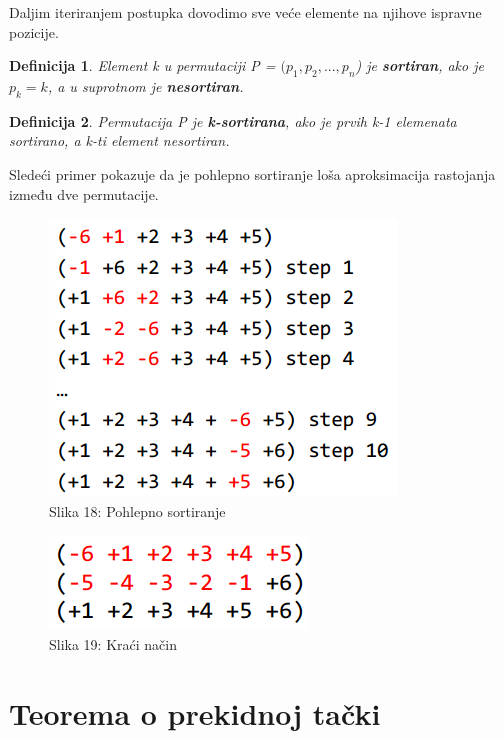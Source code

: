 \documentclass{article}
\newtheorem{definicija}{Definicija}
\begin{document}

\noindent Daljim iteriranjem postupka dovodimo sve veće elemente na njihove ispravne pozicije.

\newpage
\begin{definicija}{Element k u permutaciji P = $(p_1, p_2, ..., p_n$) je \textbf{sortiran}, ako je $p_k = k$, a u suprotnom je \textbf{nesortiran}.}
\end{definicija}

\begin{definicija}{Permutacija P je \textbf{k-sortirana}, ako je prvih k-1 elemenata sortirano, a k-ti element nesortiran.}
\end{definicija}

\noindent Sledeći primer pokazuje da je pohlepno sortiranje loša aproksimacija rastojanja između dve permutacije.\\

\begin{figure}[h]
\centering
\includegraphics[scale=0.75]{slike/los_greedy.PNG}
\caption{Slika 18: Pohlepno sortiranje}
\label{slika:X}
\end{figure}

\begin{figure}[h]
\centering
\includegraphics[scale=0.75]{slike/kraci.PNG}
\caption{Slika 19: Kraći način}
\label{slika:X}
\end{figure}

\section{Teorema o prekidnoj tački}
\end{document}
